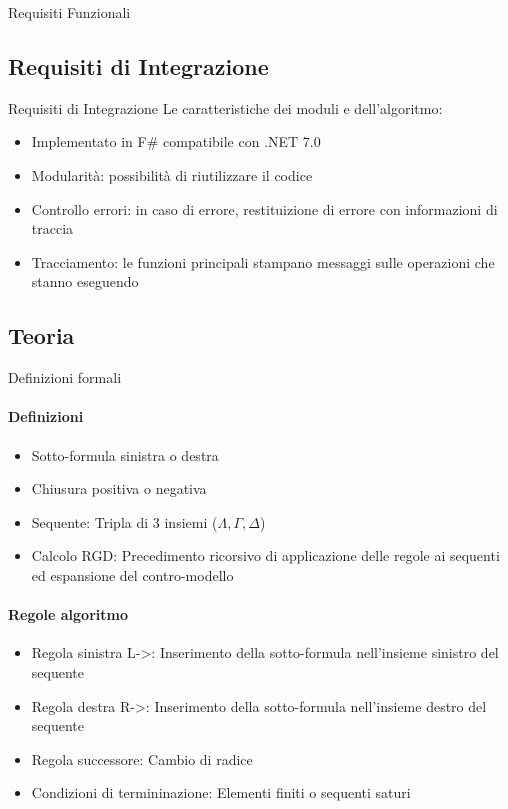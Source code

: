\documentclass{beamer}
\begin{document}
\begin{darkframes}
\begin{frame}{Requisiti Funzionali}
    \end{frame}

    \subsection{Requisiti di Integrazione}
    \begin{frame}{Requisiti di Integrazione}
        Le caratteristiche dei moduli e dell'algoritmo:
        \begin{itemize}
            \item Implementato in F\# compatibile con .NET 7.0
            \item Modularità: possibilità di riutilizzare il codice
            \item Controllo errori: in caso di errore, restituizione di errore con informazioni di traccia
            \item Tracciamento: le funzioni principali stampano messaggi sulle operazioni che stanno eseguendo
        \end{itemize}
    \end{frame}

    \subsection{Teoria}
    \begin{frame}{Definizioni formali}
        \framesubtitle{Definizioni}
        \begin{itemize}
            \item Sotto-formula sinistra o destra
            \item Chiusura positiva o negativa
            \item Sequente: Tripla di 3 insiemi ($\Lambda, \Gamma, \Delta$)
            \item Calcolo RGD: Precedimento ricorsivo di applicazione delle regole ai sequenti ed espansione del contro-modello
        \end{itemize}

        \framesubtitle{Regole algoritmo}
        \begin{itemize}
            \item Regola sinistra L->: Inserimento della sotto-formula nell'insieme sinistro del sequente
            \item Regola destra R->: Inserimento della sotto-formula nell'insieme destro del sequente
            \item Regola successore: Cambio di radice
            \item Condizioni di termininazione: Elementi finiti o sequenti saturi
        \end{itemize}
    \end{frame}


\end{darkframes}
\end{document}
